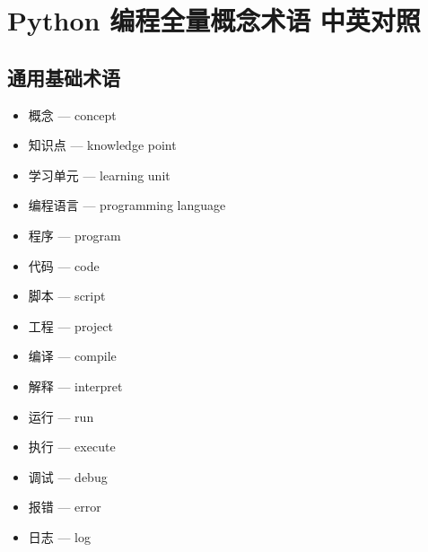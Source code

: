 
\section{Python 编程全量概念术语 中英对照}

\subsection{通用基础术语}
\begin{itemize}
\item 概念 — concept
\item 知识点 — knowledge point
\item 学习单元 — learning unit
\item 编程语言 — programming language
\item 程序 — program
\item 代码 — code
\item 脚本 — script
\item 工程 — project
\item 编译 — compile
\item 解释 — interpret
\item 运行 — run
\item 执行 — execute
\item 调试 — debug
\item 报错 — error
\item 日志 — log
\end{itemize}

